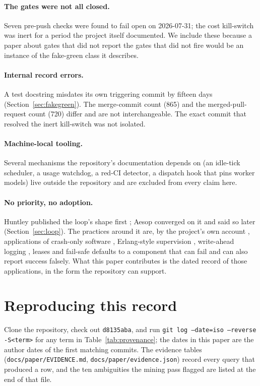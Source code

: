 \documentclass[11pt]{article}
\newcommand{\sha}[1]{\texttt{\small #1}}
\newcommand{\file}[1]{\texttt{\small #1}}
\begin{document}
\paragraph{The gates were not all closed.} Seven pre-push checks were found to fail open on 2026-07-31; the cost kill-switch was inert for a period the project itself documented. We include these because a paper about gates that did not report the gates that did not fire would be an instance of the fake-green class it describes.

\paragraph{Internal record errors.} A test docstring misdates its own triggering commit by fifteen days (Section~\ref{sec:fakegreen}). The merge-commit count (865) and the merged-pull-request count (720) differ and are not interchangeable. The exact commit that resolved the inert kill-switch was not isolated.

\paragraph{Machine-local tooling.} Several mechanisms the repository's documentation depends on (an idle-tick scheduler, a usage watchdog, a red-CI detector, a dispatch hook that pins worker models) live outside the repository and are excluded from every claim here.

\paragraph{No priority, no adoption.} Huntley published the loop's shape first \cite{huntley2025}; Aesop converged on it and said so later (Section~\ref{sec:loop}). The practices around it are, by the project's own account \cite{nothingnew}, applications of crash-only software \cite{candea2003}, Erlang-style supervision \cite{armstrong2003}, write-ahead logging \cite{mohan1992}, leases \cite{gray1989} and fail-safe defaults \cite{saltzer1975} to a component that can fail and can also report success falsely. What this paper contributes is the dated record of those applications, in the form the repository can support.

\section{Reproducing this record}

Clone the repository, check out \sha{d8135aba}, and run \texttt{git log --date=iso --reverse -S<term>} for any term in Table~\ref{tab:provenance}; the dates in this paper are the author dates of the first matching commits. The evidence tables (\file{docs/paper/EVIDENCE.md}, \file{docs/paper/evidence.json}) record every query that produced a row, and the ten ambiguities the mining pass flagged are listed at the end of that file.
\end{document}
